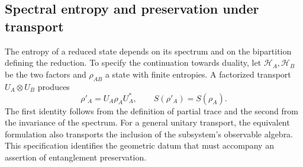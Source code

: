 \subsection{Spectral entropy and preservation under transport}
\label{v:v:ant:sec:biparticion-transporte}

The entropy of a reduced state depends on its spectrum and on the bipartition defining the reduction. To specify the continuation towards duality, let \(\mathcal H_A,\mathcal H_B\) be the two factors and \(\rho_{AB}\) a state with finite entropies. A factorized transport \(U_A\otimes U_B\) produces
\[
 \rho'_A=U_A\rho_AU_A^*,\qquad S(\rho'_A)=S(\rho_A).
\]
The first identity follows from the definition of partial trace and the second from the invariance of the spectrum. For a general unitary transport, the equivalent formulation also transports the inclusion of the subsystem's observable algebra. This specification identifies the geometric datum that must accompany an assertion of entanglement preservation.
